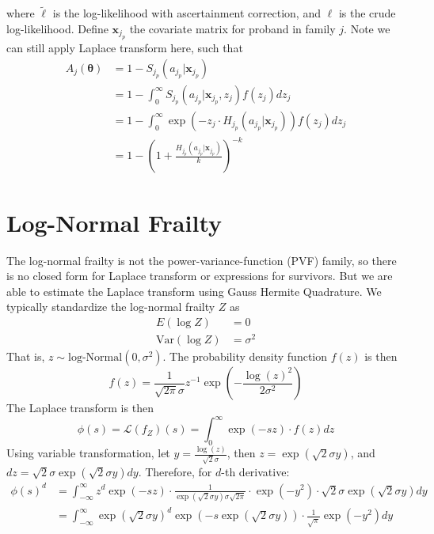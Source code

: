 \documentclass[preprint,12pt]{elsarticle}
\begin{document}
where $\tilde{\ell}$ is the log-likelihood with ascertainment correction, and $\ell$ is the crude log-likelihood. Define $\mathbf{x}_{j_p}$ the covariate matrix for proband in family $j$. Note we can still apply Laplace transform here, such that
\begin{align}
    A_j(\boldsymbol{\theta})&=1-S_{j_p}(a_{j_p}|\mathbf{x}_{j_p})\\
    &=1-\int_0^{\infty} S_{j_p}(a_{j_p}|\mathbf{x}_{j_p},z_j)f(z_j)dz_j\\
    &=1-\int_0^{\infty}\exp(-z_j\cdot H_{j_p}(a_{j_p}|\mathbf{x}_{j_p}))f(z_j)dz_j\\
    &=1-(1+\frac{H_{j_p}(a_{j_p}|\mathbf{x}_{j_p})}{k})^{-k}
\end{align}
\section{Log-Normal Frailty}
The log-normal frailty is not the power-variance-function (PVF) family, so there is no closed form for Laplace transform or expressions for survivors. But we are able to estimate the Laplace transform using Gauss Hermite Quadrature. We typically standardize the log-normal frailty $Z$ as
\begin{align} 
    E(\log Z)&=0\\
    \text{Var}(\log Z)&=\sigma^2
\end{align} 
That is, $z\sim \text{log-Normal}(0, \sigma^2)$. The probability density function $f(z)$ is then
\begin{equation}\label{eq:lognormalfrailty}
    f(z)=\frac{1}{\sqrt{2\pi}\sigma}z^{-1}\exp (-\frac{\log (z)^2}{2\sigma^2})
\end{equation}
The Laplace transform is then
\begin{equation}
    \phi(s)=\mathscr{L}(f_Z)(s)=\int_0^{\infty}\exp(-sz)\cdot f(z)dz
\end{equation}
Using variable transformation, let $y=\frac{\log(z)}{\sqrt{2}\sigma}$, then $z=\exp(\sqrt{2}\sigma y)$, and $dz=\sqrt{2}\sigma\exp(\sqrt{2}\sigma y)dy$. Therefore, for $d$-th derivative:
\begin{align}
    \phi(s)^d&=\int_{-\infty}^{\infty}z^d\exp(-sz)\cdot\frac{1}{\exp(\sqrt{2}\sigma y)\sigma\sqrt{2\pi}}\cdot\exp(-y^2)\cdot\sqrt{2}\sigma\exp(\sqrt{2}\sigma y)dy\\
    &=\int_{-\infty}^{\infty}\exp(\sqrt{2}\sigma y)^d\exp(-s\exp(\sqrt{2}\sigma y))\cdot\frac{1}{\sqrt{\pi}}\exp(-y^2)dy
\end{align}
\end{document}
